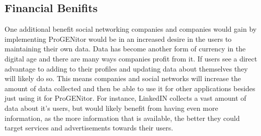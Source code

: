 \subsection{Financial Benifits}
		One additional benefit social networking companies and companies would gain by
	implementing ProGENitor would be in an increased desire in the users to
	maintaining their own data.  Data has become another form of currency in the
	digital age and there are many ways companies profit from it.  If users see a
	direct advantage to adding to their profiles and updating data about themselves
	they will likely do so.  This means companies and social networks will increase
	the amount of data collected and then be able to use it for other applications
	besides just using it for ProGENitor.  For instance, LinkedIN collects a vast
	amount of data about it's users, but would likely benefit from having even more
	information, as the more information that is available, the better they could
	target services and advertisements towards their users.
